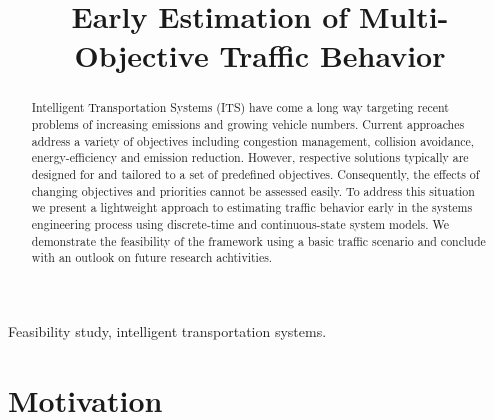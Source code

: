 \documentclass[conference]{../cls/IEEEtran}
\begin{document}
\title{Early Estimation of Multi-Objective Traffic Behavior}

\author{
	\and
}

\maketitle

\begin{abstract}
Intelligent Transportation Systems (ITS) have come a long way targeting recent problems of increasing emissions and growing vehicle numbers. Current approaches address a variety of objectives including congestion management, collision avoidance, energy-efficiency and emission reduction. However, respective solutions typically are designed for and tailored to a set of predefined objectives. Consequently, the effects of changing objectives and priorities cannot be assessed easily. To address this situation we present a lightweight approach to estimating traffic behavior early in the systems engineering process using discrete-time and continuous-state system models. We demonstrate the feasibility of the framework using a basic traffic scenario and conclude with an outlook on future research achtivities.
\end{abstract}

\begin{IEEEkeywords}
Feasibility study, intelligent transportation systems.
\end{IEEEkeywords}

\section{Motivation}
\label{sec:motivation}
\end{document}
